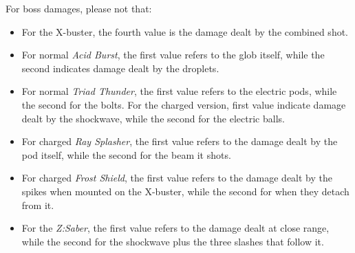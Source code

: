 For boss damages, please not that:
\begin{itemize}
	\item For the X-buster, the fourth value is the damage dealt by the combined shot.
	\item For normal \emph{Acid Burst}, the first value refers to the glob itself, while the second indicates damage dealt by the droplets.
	\item For normal \emph{Triad Thunder}, the first value refers to the electric pods, while the second for the bolts. For the charged version, first value indicate damage dealt by the shockwave, while the second for  the electric balls.
	\item For charged \emph{Ray Splasher}, the first value refers to the damage dealt by the pod itself, while the second for the beam it shots.
	\item For charged \emph{Frost Shield}, the first value refers to the damage dealt by the spikes when mounted on the X-buster, while the second for when they detach from it.
	\item For the \emph{Z:Saber}, the first value refers to the damage dealt at close range, while the second for the shockwave plus the three slashes that follow it.
\end{itemize}

